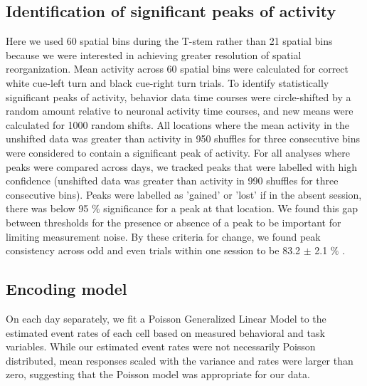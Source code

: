 \subsection{Identification of significant peaks of activity}\label{methods:peaks}
Here we used 60 spatial bins during the T-stem rather than 21 spatial bins because we were interested in achieving greater resolution of spatial reorganization. Mean activity across 60 spatial bins were calculated for correct white cue-left turn and black cue-right turn trials. To identify statistically significant peaks of activity, behavior data time courses were circle-shifted by a random amount relative to neuronal activity time courses, and new means were calculated for 1000 random shifts. All locations where the mean activity in the unshifted data was greater than activity in 950 shuffles for three consecutive bins were considered to contain a significant peak of activity. For all analyses where peaks were compared across days, we tracked peaks that were labelled with high confidence (unshifted data was greater than activity in 990 shuffles for three consecutive bins). Peaks were labelled as 'gained' or 'lost' if in the absent session, there was below 95 $\%$  significance for a peak at that location. We found this gap between thresholds for the presence or absence of a peak to be important for limiting measurement noise. By these criteria for change, we found peak consistency across odd and even trials within one session to be 83.2 $\pm$ 2.1  $\%$ .

\subsection{Encoding model}
On each day separately, we fit a Poisson Generalized Linear Model \citep{Friedman2010} to the estimated event rates of each cell based on measured behavioral and task variables. While our estimated event rates were not necessarily Poisson distributed, mean responses scaled with the variance and rates were larger than zero, suggesting that the Poisson model was appropriate for our data.

